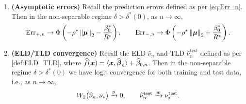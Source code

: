 \begin{thm}
\begin{enumerate}[label=(\alph*)]
        \item \label{thm:logistic_main(c)}
        \textbf{(Asymptotic errors)} Recall the prediction errors defined as per \cref{eq:Err_n}. Then in the non-separable regime $\delta > \delta^*(0)$, as $n \to \infty$,
        \begin{equation*}
            \mathrm{Err}_{+,n}  \to  \Phi \left(- \rho^* \left\|{\text{\boldmath $\mu$}}\right\|_2 - \frac{\beta_0^*}{R^*} \right),
            \qquad
            \mathrm{Err}_{-,n}  \to  \Phi \left(- \rho^* \left\|{\text{\boldmath $\mu$}}\right\|_2  + \frac{\beta_0^*}{R^*} \right).
        \end{equation*}

        \item \label{thm:logistic_main(d)}
        \textbf{(ELD/TLD convergence)} 
        Recall the ELD $\hat\nu_n$ and TLD $\hat\nu_n^\mathrm{test}$ defined as per \cref{def:ELD_TLD}, where $\widehat f(\text{\boldmath $x$}) = \langle \text{\boldmath $x$}, \widehat{{\boldsymbol{\beta}}}_n \rangle + \widehat\beta_{0, n}$.
        Then in the non-separable regime $\delta > \delta^*(0)$ we have logit convergence for both training and test data, i.e., as $n \to \infty$,
        \begin{equation*}
            W_2\bigl(\widehat{\nu}_n , \nu_* \bigr) \xrightarrow{\mathrm{p}} 0,
            \qquad
            \widehat{\nu}_n^\mathrm{test} \xrightarrow{w} \nu^\mathrm{test}_*.
        \end{equation*}
    \end{enumerate}
\end{thm}

